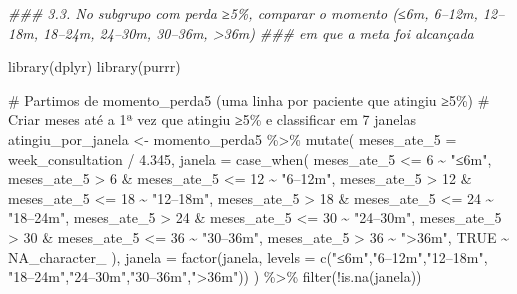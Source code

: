 \documentclass[
]{article}
\newenvironment{Shaded}{\begin{snugshade}}{\end{snugshade}}
\newcommand{\AttributeTok}[1]{\textcolor[rgb]{0.40,0.45,0.13}{#1}}
\newcommand{\CommentTok}[1]{\textcolor[rgb]{0.37,0.37,0.37}{#1}}
\newcommand{\ConstantTok}[1]{\textcolor[rgb]{0.56,0.35,0.01}{#1}}
\newcommand{\DecValTok}[1]{\textcolor[rgb]{0.68,0.00,0.00}{#1}}
\newcommand{\DocumentationTok}[1]{\textcolor[rgb]{0.37,0.37,0.37}{\textit{#1}}}
\newcommand{\FloatTok}[1]{\textcolor[rgb]{0.68,0.00,0.00}{#1}}
\newcommand{\FunctionTok}[1]{\textcolor[rgb]{0.28,0.35,0.67}{#1}}
\newcommand{\NormalTok}[1]{\textcolor[rgb]{0.00,0.23,0.31}{#1}}
\newcommand{\OtherTok}[1]{\textcolor[rgb]{0.00,0.23,0.31}{#1}}
\newcommand{\SpecialCharTok}[1]{\textcolor[rgb]{0.37,0.37,0.37}{#1}}
\newcommand{\StringTok}[1]{\textcolor[rgb]{0.13,0.47,0.30}{#1}}
\begin{document}
\begin{Shaded}
\begin{Highlighting}[]
\DocumentationTok{\#\#\# 3.3. No subgrupo com perda ≥5\%, comparar o momento (≤6m, 6–12m, 12–18m, 18–24m, 24–30m, 30–36m, \textgreater{}36m)}
\DocumentationTok{\#\#\# em que a meta foi alcançada}

\FunctionTok{library}\NormalTok{(dplyr)}
\FunctionTok{library}\NormalTok{(purrr)}

\CommentTok{\# Partimos de \textasciigrave{}momento\_perda5\textasciigrave{} (uma linha por paciente que atingiu ≥5\%)}
\CommentTok{\# Criar meses até a 1ª vez que atingiu ≥5\% e classificar em 7 janelas}
\NormalTok{atingiu\_por\_janela }\OtherTok{\textless{}{-}}\NormalTok{ momento\_perda5 }\SpecialCharTok{\%\textgreater{}\%}
  \FunctionTok{mutate}\NormalTok{(}
    \AttributeTok{meses\_ate\_5 =}\NormalTok{ week\_consultation }\SpecialCharTok{/} \FloatTok{4.345}\NormalTok{,}
    \AttributeTok{janela =} \FunctionTok{case\_when}\NormalTok{(}
\NormalTok{      meses\_ate\_5 }\SpecialCharTok{\textless{}=} \DecValTok{6}                       \SpecialCharTok{\textasciitilde{}} \StringTok{"≤6m"}\NormalTok{,}
\NormalTok{      meses\_ate\_5 }\SpecialCharTok{\textgreater{}} \DecValTok{6}   \SpecialCharTok{\&}\NormalTok{ meses\_ate\_5 }\SpecialCharTok{\textless{}=} \DecValTok{12}  \SpecialCharTok{\textasciitilde{}} \StringTok{"6–12m"}\NormalTok{,}
\NormalTok{      meses\_ate\_5 }\SpecialCharTok{\textgreater{}} \DecValTok{12}  \SpecialCharTok{\&}\NormalTok{ meses\_ate\_5 }\SpecialCharTok{\textless{}=} \DecValTok{18}  \SpecialCharTok{\textasciitilde{}} \StringTok{"12–18m"}\NormalTok{,}
\NormalTok{      meses\_ate\_5 }\SpecialCharTok{\textgreater{}} \DecValTok{18}  \SpecialCharTok{\&}\NormalTok{ meses\_ate\_5 }\SpecialCharTok{\textless{}=} \DecValTok{24}  \SpecialCharTok{\textasciitilde{}} \StringTok{"18–24m"}\NormalTok{,}
\NormalTok{      meses\_ate\_5 }\SpecialCharTok{\textgreater{}} \DecValTok{24}  \SpecialCharTok{\&}\NormalTok{ meses\_ate\_5 }\SpecialCharTok{\textless{}=} \DecValTok{30}  \SpecialCharTok{\textasciitilde{}} \StringTok{"24–30m"}\NormalTok{,}
\NormalTok{      meses\_ate\_5 }\SpecialCharTok{\textgreater{}} \DecValTok{30}  \SpecialCharTok{\&}\NormalTok{ meses\_ate\_5 }\SpecialCharTok{\textless{}=} \DecValTok{36}  \SpecialCharTok{\textasciitilde{}} \StringTok{"30–36m"}\NormalTok{,}
\NormalTok{      meses\_ate\_5 }\SpecialCharTok{\textgreater{}} \DecValTok{36}                       \SpecialCharTok{\textasciitilde{}} \StringTok{"\textgreater{}36m"}\NormalTok{,}
      \ConstantTok{TRUE} \SpecialCharTok{\textasciitilde{}} \ConstantTok{NA\_character\_}
\NormalTok{    ),}
    \AttributeTok{janela =} \FunctionTok{factor}\NormalTok{(janela,}
                    \AttributeTok{levels =} \FunctionTok{c}\NormalTok{(}\StringTok{"≤6m"}\NormalTok{,}\StringTok{"6–12m"}\NormalTok{,}\StringTok{"12–18m"}\NormalTok{,}
                               \StringTok{"18–24m"}\NormalTok{,}\StringTok{"24–30m"}\NormalTok{,}\StringTok{"30–36m"}\NormalTok{,}\StringTok{"\textgreater{}36m"}\NormalTok{))}
\NormalTok{  ) }\SpecialCharTok{\%\textgreater{}\%}
  \FunctionTok{filter}\NormalTok{(}\SpecialCharTok{!}\FunctionTok{is.na}\NormalTok{(janela))}


\end{Highlighting}
\end{Shaded}
\end{document}
